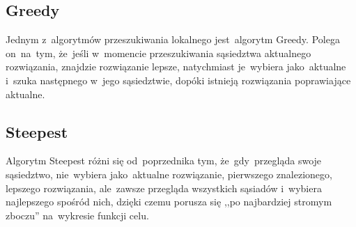 \subsection{Greedy}

Jednym z~algorytmów przeszukiwania lokalnego jest~algorytm Greedy. Polega on~na~tym, że~jeśli w~momencie przeszukiwania sąsiedztwa aktualnego rozwiązania, znajdzie rozwiązanie lepsze, natychmiast je~wybiera jako~aktualne i~szuka następnego w~jego sąsiedztwie, dopóki istnieją rozwiązania poprawiające aktualne.

\subsection{Steepest}

Algorytm Steepest różni się od~poprzednika tym, że~gdy~przegląda swoje sąsiedztwo, nie~wybiera jako~aktualne rozwiązanie, pierwszego znalezionego, lepszego rozwiązania, ale~zawsze przegląda wszystkich sąsiadów i~wybiera najlepszego spośród nich, dzięki czemu porusza się ,,po najbardziej stromym zboczu'' na~wykresie funkcji celu.